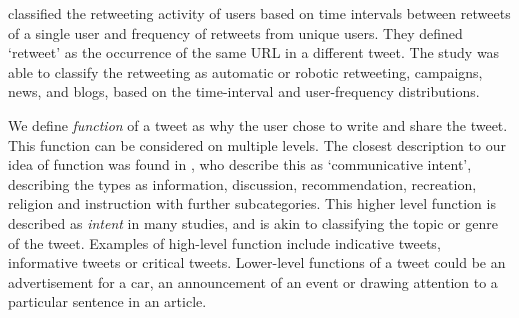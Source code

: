 \cite{ghosh2011entropy} classified the retweeting activity of users based on time intervals between retweets of a single user and frequency of retweets from unique users. They defined `retweet' as the occurrence of the same URL in a different tweet. The study was able to classify the retweeting as automatic or robotic retweeting, campaigns, news, and blogs, based on the time-interval and user-frequency distributions. 


We define \textit{function} of a tweet as why the user chose to write and share the tweet. This function can be considered on multiple levels. The closest description to our idea of function was found in \cite{sinclair1996preliminary}, who describe this as `communicative intent', describing the types as information, discussion, recommendation, recreation, religion and instruction with further subcategories. This higher level function is described as \textit{intent} in many studies, and is akin to classifying the topic or genre of the tweet. Examples of high-level function include indicative tweets, informative tweets or critical tweets. Lower-level functions of a tweet could be an advertisement for a car, an announcement of an event or drawing attention to a particular sentence in an article. 

